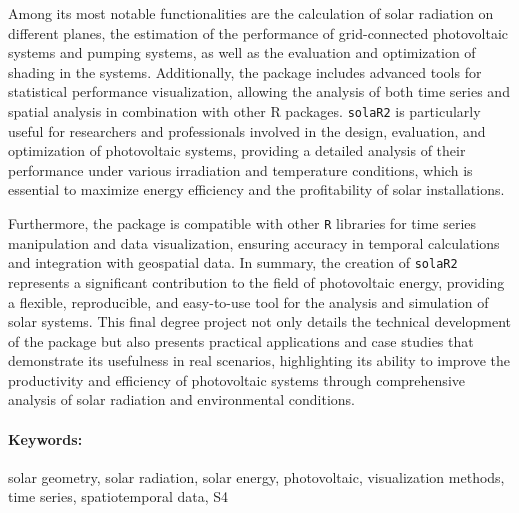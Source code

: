 Among its most notable functionalities are the calculation of solar radiation on different planes, the estimation of the performance of grid-connected photovoltaic systems and pumping systems, as well as the evaluation and optimization of shading in the systems. Additionally, the package includes advanced tools for statistical performance visualization, allowing the analysis of both time series and spatial analysis in combination with other R packages. \texttt{solaR2} is particularly useful for researchers and professionals involved in the design, evaluation, and optimization of photovoltaic systems, providing a detailed analysis of their performance under various irradiation and temperature conditions, which is essential to maximize energy efficiency and the profitability of solar installations.

Furthermore, the package is compatible with other \texttt{R} libraries for time series manipulation and data visualization, ensuring accuracy in temporal calculations and integration with geospatial data. In summary, the creation of \texttt{solaR2} represents a significant contribution to the field of photovoltaic energy, providing a flexible, reproducible, and easy-to-use tool for the analysis and simulation of solar systems. This final degree project not only details the technical development of the package but also presents practical applications and case studies that demonstrate its usefulness in real scenarios, highlighting its ability to improve the productivity and efficiency of photovoltaic systems through comprehensive analysis of solar radiation and environmental conditions.

\paragraph{Keywords:}
solar geometry, solar radiation, solar energy, photovoltaic, visualization methods, time series, spatiotemporal data, S4

